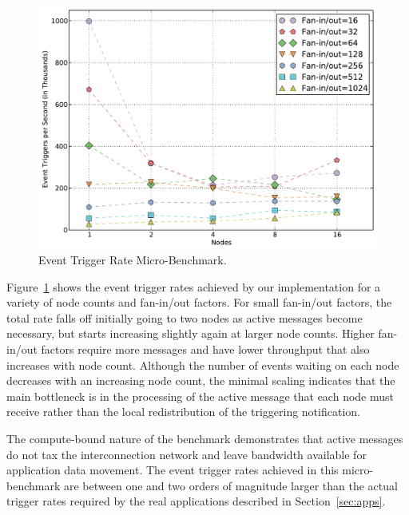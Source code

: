 \begin{figure}
\begin{center}
\includegraphics[scale=0.33]{figs/event_throughput.pdf}
\end{center}
\vspace{-2mm}
\caption{Event Trigger Rate Micro-Benchmark.\label{fig:eventthroo}}
\vspace{-4mm}
\end{figure}

Figure~\ref{fig:eventthroo} shows the event trigger rates achieved by our implementation
for a variety of node counts and fan-in/out factors.
For small fan-in/out factors, the total rate falls off initially going to two nodes as active
messages become necessary, but starts increasing slightly again at larger node counts.  Higher
fan-in/out factors require more messages and have lower throughput that also increases with
node count.  Although the number of events waiting on each node decreases with an increasing
node count, the minimal scaling indicates that the main bottleneck is in the processing of the
active message that each node must receive rather than the local redistribution of the triggering
notification.

The compute-bound nature of the benchmark demonstrates that active messages do not tax 
the interconnection network and leave bandwidth available for application data movement.  
The event trigger rates achieved in this micro-benchmark are between one and two orders
of magnitude larger than the actual trigger rates required by the real applications
described in Section~\ref{sec:apps}.

